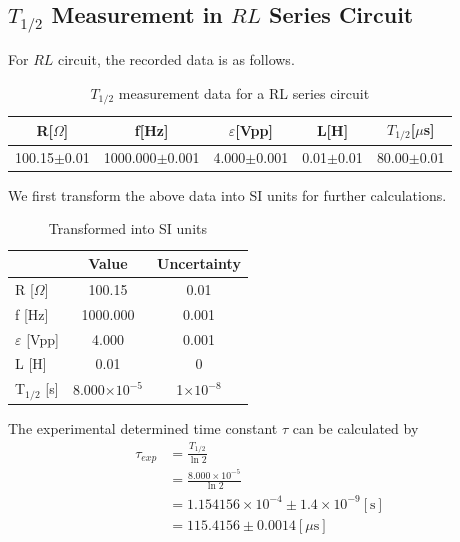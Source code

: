 \documentclass[a4paper]{article}
\begin{document}
\subsection{$T_{1/2}$ Measurement in $RL$ Series Circuit}

For $RL$ circuit, the recorded data is as follows.
\begin{table}[!htbp]
	\centering
	\begin{tabular}{ccccc}
		\hline
		R[$\Omega$]     & f[Hz]              & $\varepsilon$[Vpp] & L[H]          & $T_{1/2}$[$\mu$s] \\
		\hline
		100.15$\pm$0.01 & 1000.000$\pm$0.001 & 4.000$\pm$0.001    & 0.01$\pm$0.01 & 80.00$\pm$0.01    \\
		\hline
	\end{tabular}%
	\caption{$T_{1/2}$ measurement data for a RL series circuit}
\end{table}

We first transform the above data into SI units for further calculations.
\begin{table}[!htbp]
	\centering
	\begin{tabular}{l c c}
		\hline
		                    & Value                 & Uncertainty       \\
		\hline
		R [$\Omega$]        & 100.15                & 0.01              \\
		f [Hz]              & 1000.000              & 0.001             \\
		$\varepsilon$ [Vpp] & 4.000                 & 0.001             \\
		L [H]               & 0.01                  & 0                 \\
		T$_{1/2}$ [s]       & 8.000$\times 10^{-5}$ & 1$\times 10^{-8}$ \\
		\hline
	\end{tabular}
	\caption{Transformed into SI units}
\end{table}

The experimental determined time constant $\tau$ can be calculated by
\begin{align*}
	\tau_{exp}
	 & =\frac{T_{1/2}}{\ln2}                                  \\
	 & =\frac{8.000\times 10^{-5}}{\ln2}                      \\
	 & =1.154156\times 10^{-4}\pm 1.4\times 10^{-9}[\text{s}] \\
	 & =115.4156\pm 0.0014[\mu \text{s}]
\end{align*}
\end{document}
